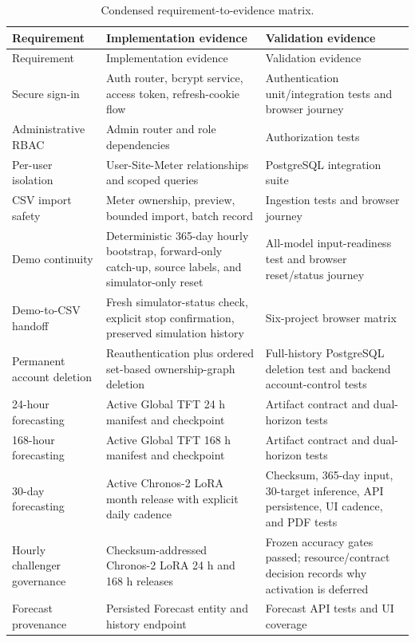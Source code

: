 \begin{longtable}{p{}p{}p{}}
\caption{Condensed requirement-to-evidence matrix.}\\
\toprule
Requirement & Implementation evidence & Validation evidence \\
\midrule
\endfirsthead
\toprule
Requirement & Implementation evidence & Validation evidence \\
\midrule
\endhead
Secure sign-in & Auth router, bcrypt service, access token, refresh-cookie flow & Authentication unit/integration tests and browser journey \\
Administrative RBAC & Admin router and role dependencies & Authorization tests \\
Per-user isolation & User-Site-Meter relationships and scoped queries & PostgreSQL integration suite \\
CSV import safety & Meter ownership, preview, bounded import, batch record & Ingestion tests and browser journey \\
Demo continuity & Deterministic 365-day hourly bootstrap, forward-only catch-up, source labels, and simulator-only reset & All-model input-readiness test and browser reset/status journey \\
Demo-to-CSV handoff & Fresh simulator-status check, explicit stop confirmation, preserved simulation history & Six-project browser matrix \\
Permanent account deletion & Reauthentication plus ordered set-based ownership-graph deletion & Full-history PostgreSQL deletion test and backend account-control tests \\
24-hour forecasting & Active Global TFT 24 h manifest and checkpoint & Artifact contract and dual-horizon tests \\
168-hour forecasting & Active Global TFT 168 h manifest and checkpoint & Artifact contract and dual-horizon tests \\
30-day forecasting & Active Chronos-2 LoRA month release with explicit daily cadence & Checksum, 365-day input, 30-target inference, API persistence, UI cadence, and PDF tests \\
Hourly challenger governance & Checksum-addressed Chronos-2 LoRA 24 h and 168 h releases & Frozen accuracy gates passed; resource/contract decision records why activation is deferred \\
Forecast provenance & Persisted Forecast entity and history endpoint & Forecast API tests and UI coverage \\

\end{longtable}
